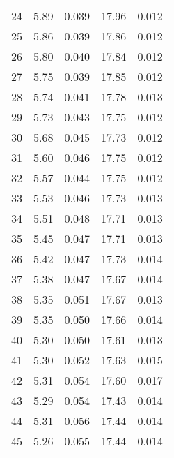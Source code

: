 \begin{table}
\begin{tabular}{c|ll|ll}
24 & 5.89 & 0.039 & 17.96 & 0.012 \\
25 & 5.86 & 0.039 & 17.86 & 0.012 \\
26 & 5.80 & 0.040 & 17.84 & 0.012 \\
27 & 5.75 & 0.039 & 17.85 & 0.012 \\
28 & 5.74 & 0.041 & 17.78 & 0.013 \\
29 & 5.73 & 0.043 & 17.75 & 0.012 \\
30 & 5.68 & 0.045 & 17.73 & 0.012 \\
31 & 5.60 & 0.046 & 17.75 & 0.012 \\
32 & 5.57 & 0.044 & 17.75 & 0.012 \\
33 & 5.53 & 0.046 & 17.73 & 0.013 \\
34 & 5.51 & 0.048 & 17.71 & 0.013 \\
35 & 5.45 & 0.047 & 17.71 & 0.013 \\
36 & 5.42 & 0.047 & 17.73 & 0.014 \\
37 & 5.38 & 0.047 & 17.67 & 0.014 \\
38 & 5.35 & 0.051 & 17.67 & 0.013 \\
39 & 5.35 & 0.050 & 17.66 & 0.014 \\
40 & 5.30 & 0.050 & 17.61 & 0.013 \\
41 & 5.30 & 0.052 & 17.63 & 0.015 \\
42 & 5.31 & 0.054 & 17.60 & 0.017 \\
43 & 5.29 & 0.054 & 17.43 & 0.014 \\
44 & 5.31 & 0.056 & 17.44 & 0.014 \\
45 & 5.26 & 0.055 & 17.44 & 0.014 \\
               \hline
        \end{tabular}
    \end{table}
    \clearpage

